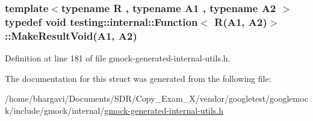 \subsubsection[{\texorpdfstring{Make\+Result\+Void}{MakeResultVoid}}]{\setlength{\rightskip}{0pt plus 5cm}template$<$typename R , typename A1 , typename A2 $>$ typedef void {\bf testing\+::internal\+::\+Function}$<$ {\bf R}(A1, A2)$>$\+::Make\+Result\+Void(A1, A2)}\hypertarget{structtesting_1_1internal_1_1_function_3_01_r_07_a1_00_01_a2_08_4_ada1ad22fa21c84ec3faea47ed20c1b46}{}\label{structtesting_1_1internal_1_1_function_3_01_r_07_a1_00_01_a2_08_4_ada1ad22fa21c84ec3faea47ed20c1b46}


Definition at line 181 of file gmock-\/generated-\/internal-\/utils.\+h.



The documentation for this struct was generated from the following file\+:\begin{DoxyCompactItemize}
\item 
/home/bhargavi/\+Documents/\+S\+D\+R/\+Copy\+\_\+\+Exam\+\_\+X/vendor/googletest/googlemock/include/gmock/internal/\hyperlink{gmock-generated-internal-utils_8h}{gmock-\/generated-\/internal-\/utils.\+h}\end{DoxyCompactItemize}

